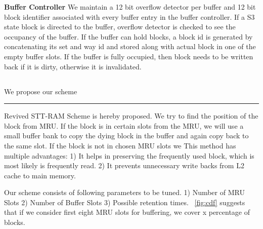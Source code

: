 \noindent\textbf{Buffer Controller}
We maintain a 12 bit overflow detector per buffer and 12 bit block identifier associated with every buffer entry in the buffer controller. If a S3 state block is directed to the buffer, overflow detector is checked to see the occupancy of the buffer. If the buffer can hold blocks, a block id  is generated by concatenating its set and way id and stored along with actual block in one of the empty buffer slots. If the buffer is fully occupied, then block needs to be written back if it is dirty, otherwise it is invalidated.

\subsection{}

We propose our scheme 

\begin{figure*} [t]
\centering
 \hrule
 \caption{\label{fig:cdf} \scriptsize \bf CDF}
\end{figure*}

Revived STT-RAM Scheme is hereby proposed. We try to find the position of the block from MRU. If the block
is in certain slots from the MRU, we will use a small buffer bank to copy the dying block in the buffer and again
copy back to the same slot. If the block is not in chosen MRU slots we 
This method has multiple advantages: 1) It helps in preserving the frequently 
used block, which is most likely is frequently read. 2) It prevents unnecessary write backs from L2 cache to 
main memory. 

Our scheme consists of following parameters to be tuned. 1) Number of MRU Slots 2) Number of Buffer Slots
3) Possible retention times. ~\ref{fig:cdf} suggests that if we consider first eight MRU slots for buffering, we cover
x percentage of blocks. 


